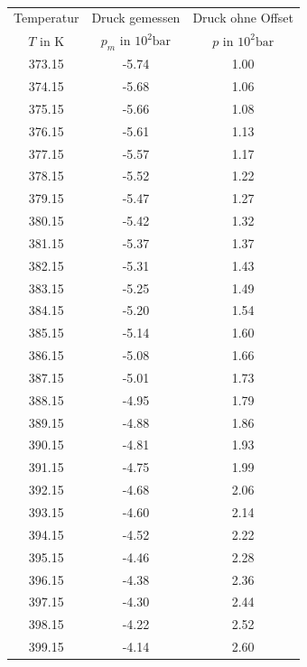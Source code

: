 \begin{table}
  \centering
  \begin{tabular}{c c c }
    \toprule
    Temperatur & Druck gemessen & Druck ohne Offset\\
    $T$ in $\si{\kelvin}$ & $p_m$ in $ 10^2\si{\bar}$ &$p$ in $ 10^2\si{\bar}$ \\
    \midrule
    373.15  &  -5.74  &  1.00  \\
    374.15  &  -5.68  &  1.06  \\
    375.15  &  -5.66  &  1.08  \\
    376.15  &  -5.61  &  1.13  \\
    377.15  &  -5.57  &  1.17  \\
    378.15  &  -5.52  &  1.22  \\
    379.15  &  -5.47  &  1.27  \\
    380.15  &  -5.42  &  1.32  \\
    381.15  &  -5.37  &  1.37  \\
    382.15  &  -5.31  &  1.43  \\
    383.15  &  -5.25  &  1.49  \\
    384.15  &  -5.20  &  1.54  \\
    385.15  &  -5.14  &  1.60  \\
    386.15  &  -5.08  &  1.66  \\
    387.15  &  -5.01  &  1.73  \\
    388.15  &  -4.95  &  1.79  \\
    389.15  &  -4.88  &  1.86  \\
    390.15  &  -4.81  &  1.93  \\
    391.15  &  -4.75  &  1.99  \\
    392.15  &  -4.68  &  2.06  \\
    393.15  &  -4.60  &  2.14  \\
    394.15  &  -4.52  &  2.22  \\
    395.15  &  -4.46  &  2.28  \\
    396.15  &  -4.38  &  2.36  \\
    397.15  &  -4.30  &  2.44  \\
    398.15  &  -4.22  &  2.52  \\
    399.15  &  -4.14  &  2.60  \\
    \bottomrule
  \end{tabular}
  \caption{}
  \label{tab:messung2}
\end{table}
